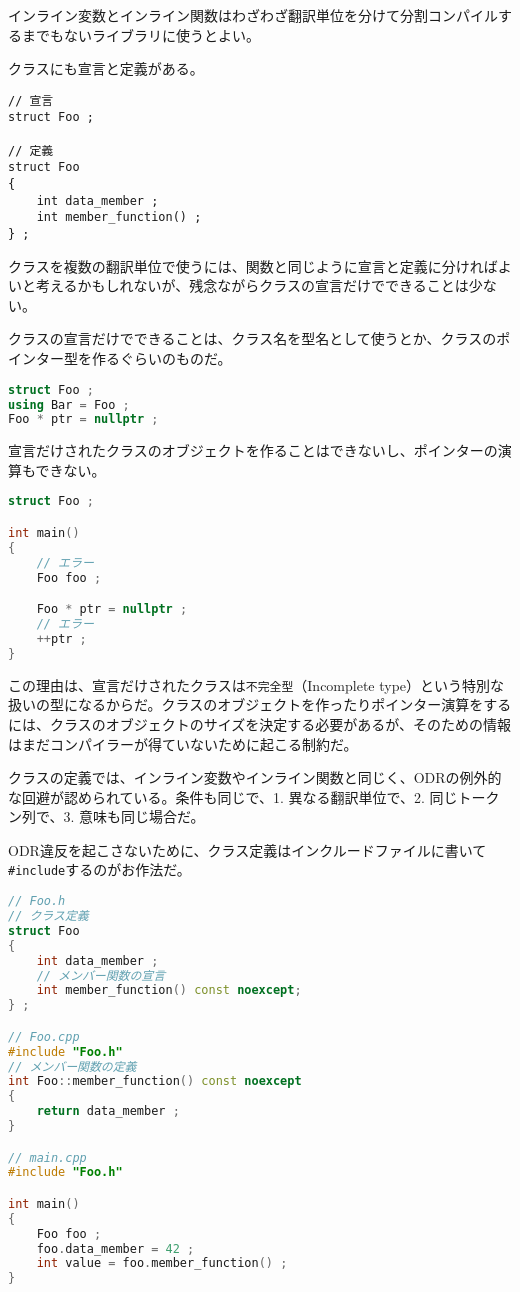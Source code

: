 インライン変数とインライン関数はわざわざ翻訳単位を分けて分割コンパイルするまでもないライブラリに使うとよい。


クラスにも宣言と定義がある。

\begin{lstlisting}[style=grammar]
// 宣言
struct Foo ;

// 定義
struct Foo
{
    int data_member ;
    int member_function() ;
} ;
\end{lstlisting}

クラスを複数の翻訳単位で使うには、関数と同じように宣言と定義に分ければよいと考えるかもしれないが、残念ながらクラスの宣言だけでできることは少ない。

クラスの宣言だけでできることは、クラス名を型名として使うとか、クラスのポインター型を作るぐらいのものだ。

\begin{lstlisting}[language={C++}]
struct Foo ;
using Bar = Foo ;
Foo * ptr = nullptr ;
\end{lstlisting}

宣言だけされたクラスのオブジェクトを作ることはできないし、ポインターの演算もできない。

\begin{lstlisting}[language={C++}]
struct Foo ;

int main()
{
    // エラー
    Foo foo ;

    Foo * ptr = nullptr ;
    // エラー
    ++ptr ;
}
\end{lstlisting}

この理由は、宣言だけされたクラスは\texttt{不完全型}（Incomplete type）という特別な扱いの型になるからだ。クラスのオブジェクトを作ったりポインター演算をするには、クラスのオブジェクトのサイズを決定する必要があるが、そのための情報はまだコンパイラーが得ていないために起こる制約だ。

クラスの定義では、インライン変数やインライン関数と同じく、ODRの例外的な回避が認められている。条件も同じで、1. 異なる翻訳単位で、2. 同じトークン列で、3. 意味も同じ場合だ。

ODR違反を起こさないために、クラス定義はインクルードファイルに書いて\,\texttt{\#include}するのがお作法だ。

\begin{lstlisting}[language={C++}]
// Foo.h
// クラス定義
struct Foo
{
    int data_member ;
    // メンバー関数の宣言
    int member_function() const noexcept;
} ;

// Foo.cpp
#include "Foo.h"
// メンバー関数の定義
int Foo::member_function() const noexcept
{
    return data_member ;
} 

// main.cpp
#include "Foo.h"

int main()
{
    Foo foo ;
    foo.data_member = 42 ;
    int value = foo.member_function() ;
}
\end{lstlisting}


